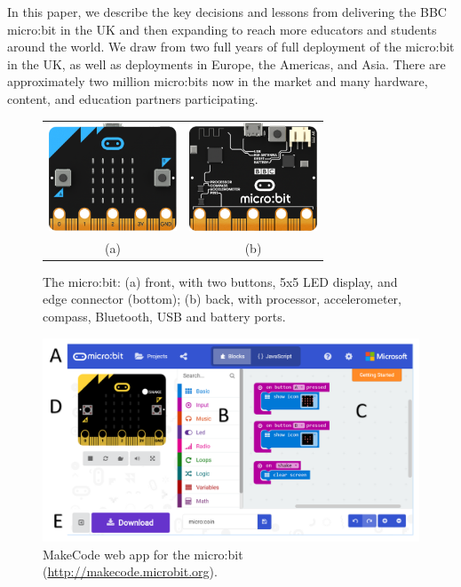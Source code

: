 In this paper, we describe the key decisions and lessons from
delivering the BBC micro:bit in the UK and then expanding to reach 
more educators and students around the world.
We draw from two full years of 
full deployment of the micro:bit in the UK, as well as deployments
in Europe, the Americas, and Asia.  There are approximately
two million micro:bits now in the market and many hardware,
content, and education partners participating. 




\begin{figure} 
  \begin{tabular}{cc}
    \includegraphics[width=1.5in]{images/microbit-front.png} &
    \includegraphics[width=1.5in]{images/microbit-back.png} \\
    (a) & (b) 
  \end{tabular}
  \caption{\label{fig:microbit}The micro:bit: (a) front, with two buttons, 
    5x5 LED display, and edge connector (bottom); (b) back, with processor, accelerometer, compass, Bluetooth, USB and battery ports.}
  \end{figure}
  
  \begin{figure}[t] 
    \includegraphics[width=6in]{images/webApp.png}
    \caption{\label{fig:snapshot}MakeCode web app for the micro:bit (\url{http://makecode.microbit.org}).}
  \end{figure}

